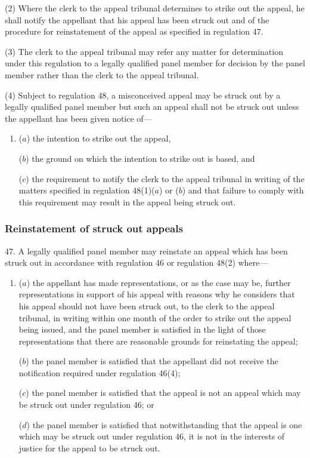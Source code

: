 \documentclass[12pt,a4paper]{article}
\begin{document}
(2) Where the clerk to the appeal tribunal determines to strike out the appeal, he shall notify the appellant that his appeal has been struck out and of the procedure for reinstatement of the appeal as specified in regulation 47.

(3) The clerk to the appeal tribunal may refer any matter for determination under this regulation to a legally qualified panel member for decision by the panel member rather than the clerk to the appeal tribunal.

(4) Subject to regulation 48, a misconceived appeal may be struck out by a legally qualified panel member but such an appeal shall not be struck out unless the appellant has been given notice of—
\begin{enumerate}\item[]
($a$) the intention to strike out the appeal,

($b$) the ground on which the intention to strike out is based, and

($c$) the requirement to notify the clerk to the appeal tribunal in writing of the matters specified in regulation 48(1)($a$) or ($b$) and that failure to comply with this requirement may result in the appeal being struck out.
\end{enumerate}

\subsubsection[47. Reinstatement of struck out appeals]{Reinstatement of struck out appeals}

47.  A legally qualified panel member may reinstate an appeal which has been struck out in accordance with regulation 46 or regulation 48(2) where—
\begin{enumerate}\item[]
($a$) the appellant has made representations, or as the case may be, further representations in support of his appeal with reasons why he considers that his appeal should not have been struck out, to the clerk to the appeal tribunal, in writing within one month of the order to strike out the appeal being issued, and the panel member is satisfied in the light of those representations that there are reasonable grounds for reinstating the appeal;

($b$) the panel member is satisfied that the appellant did not receive the notification required under regulation 46(4);

($c$) the panel member is satisfied that the appeal is not an appeal which may be struck out under regulation 46; or

($d$) the panel member is satisfied that notwithstanding that the appeal is one which may be struck out under regulation 46, it is not in the interests of justice for the appeal to be struck out.
\end{enumerate}
\end{document}

